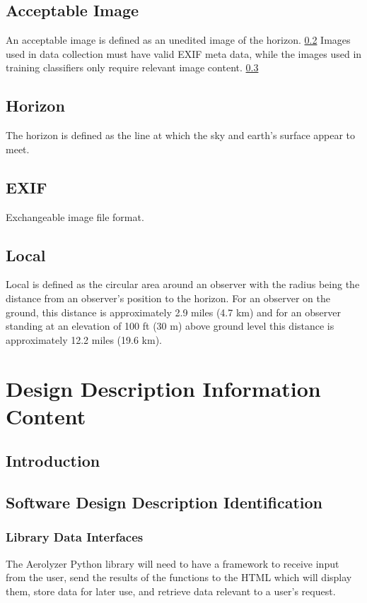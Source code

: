\documentclass[onecolumn, draftclsnofoot,10pt, compsoc]{IEEEtran}
\begin{document}
\begin{singlespace}
	\subsection{Acceptable Image}\label{def:accImg}
		An acceptable image is defined as an unedited image of the horizon. \ref{def:horizon}
		Images used in data collection must have valid EXIF meta data, while the images used in training classifiers only require relevant image content. \ref{def:exif}
	
	\subsection{Horizon}\label{def:horizon}
		The horizon is defined as the line at which the sky and earth's surface appear to meet.
	
	\subsection{EXIF}\label{def:exif}
		Exchangeable image file format.
	
	\subsection{Local}\label{def:local}
		Local is defined as the circular area around an observer with the radius being the distance from an observer's position to the horizon.
		For an observer on the ground, this distance is approximately 2.9 miles (4.7 km) and for an observer standing at an elevation of 100 ft (30 m) above ground level this distance is approximately 12.2 miles (19.6 km).

\section{Design Description Information Content}
	\subsection{Introduction}
    
    \subsection{Software Design Description Identification}
    	\subsubsection{Library Data Interfaces}
        The Aerolyzer Python library will need to have a framework to receive input from the user, send the results of the functions to the HTML which will display them, store data for later use, and retrieve data relevant to a user’s request.

\end{singlespace}
\end{document}
